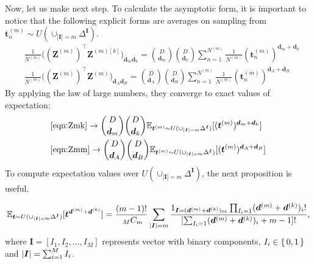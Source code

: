 \documentclass{article}
\begin{document}
Now, let us make next step.
To calculate the asymptotic form, it is important to notice that the following explicit forms are averages on sampling from $\bm t_n^{(m)} \sim U(\cup_{|\bm I|=m} \Delta^{\bm I})$.
\begin{align}
&
\frac{1}{N^{(m)}}
\Big(
(\bm Z^{(m)})^\top
\bm Z^{(m)[k]}
\Big)_{\bm d_m \bm d_k}
=
\binom{D}{\bm d_m}
\binom{D}{\bm d_k}
\sum_{n=1}^{N^{(m)}}
\frac{1}{N^{(m)}}
(\bm t_n^{(m)})^{\bm d_m + \bm d_k}
\label{eqn:Zmk}
\\
&
\frac{1}{N^{(m)}}
\Big(
(\bm Z^{(m)})^\top
\bm Z^{(m)}
\Big)_{\bm d_A \bm d_B}
=
\binom{D}{\bm d_A}
\binom{D}{\bm d_B}
\sum_{n=1}^{N^{(m)}}
\frac{1}{N^{(m)}}
(\bm t_n^{(m)})^{\bm d_A + \bm d_B}
\label{eqn:Zmm}
\end{align}
By applying the law of large numbers, they converge to exact values of expectation:
\begin{align}
&
\cref{eqn:Zmk}
\to
\binom{D}{\bm d_m}
\binom{D}{\bm d_k}
\E_{\bm t^{(m)} \sim U(\cup_{|\bm I|=m} \Delta^{\bm I})} [
(\bm t^{(m)})^{\bm d_m + \bm d_k}
]
\label{eqn:Lmk}
\\
&
\cref{eqn:Zmm}
\to
\binom{D}{\bm d_A}
\binom{D}{\bm d_B}
\E_{\bm t^{(m)} \sim U(\cup_{|\bm I|=m} \Delta^{\bm I})} [
(\bm t^{(m)})^{\bm d_A + \bm d_B}
]
\label{eqn:Lmm}
\end{align}
To compute expectation values over $U(\cup_{|\bm I|=m} \Delta^{\bm I})$, the next proposition is useful.
\begin{prop}
\begin{align}
\mathbb{E}_{\bm t \sim U(\cup_{|\bm I|=m} \Delta^{\bm I})} [
\bm t^{\bm d^{(m)} + \bm d^{(k)}}
]
=
\frac{(m-1)!}{\ _M C_m}
\sum_{|\bm I| = m}
\frac{
1_{{\bm I}=(\bm d ^{(m)} +  \bm d ^{(k)} )_{01} }
\prod_{I_i = 1}( \bm d ^{(m)} +  \bm d ^{(k)}  )_i !}{
[\sum_{I_i = 1} ( \bm d ^{(m)} +  \bm d ^{(k)}  )_i 
+ m - 1]!
},
\end{align}
where $\bm I = [I_1, I_2, \dots, I_M]$ represents vector with binary components, $I_i \in \set{0, 1}$ and $\left| \bm I \right| = \sum_{i=1}^M I_i$.
\end{prop}
\end{document}
